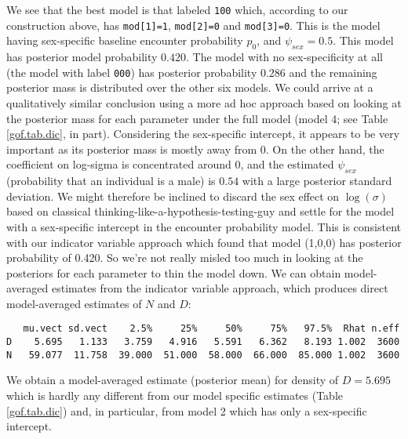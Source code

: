 {\begin{verbatim}
\end{verbatim}
We see that the best model is that labeled \mbox{\tt 100} which,
according to our construction above, has \mbox{\tt mod[1]=1},
\mbox{\tt mod[2]=0} and \mbox{\tt mod[3]=0}. This is the model 
having sex-specific baseline
encounter probability $p_{0}$, and $\psi_{sex} = 0.5$. This model has 
posterior model probability $0.420$. The model with no sex-specificity
at all (the model with label \mbox{\tt 000}) has
posterior probability $0.286$ and the remaining posterior mass is
distributed over the other six models. We could arrive at a
qualitatively similar conclusion using a more ad hoc approach based
on looking at the posterior mass for each parameter under the
full model (model 4; see Table \ref{gof.tab.dic}, in part). Considering
the sex-specific intercept, it appears to be very important as its
posterior mass is mostly away from 0.  On the other hand, the
coefficient on log-sigma is concentrated around 0, and the estimated
$\psi_{sex}$ (probability that an individual is a male) is $0.54$ with
a large posterior standard deviation.  We might therefore be inclined
to discard the sex effect on $\log(\sigma)$ based on classical
thinking-like-a-hypothesis-testing-guy and settle for the model with a
sex-specific intercept in the encounter probability model. This is consistent with our indicator variable
approach which found that model (1,0,0) has posterior probability of
0.420. So we're not really misled too much in looking at the
posteriors for each parameter to thin the model down.  We can obtain model-averaged estimates
from the indicator variable approach, which produces direct
model-averaged estimates of $N$ and $D$:
{\small
\begin{verbatim}
   mu.vect sd.vect    2.5%     25%     50%     75%   97.5%  Rhat n.eff
D    5.695   1.133   3.759   4.916   5.591   6.362   8.193 1.002  3600
N   59.077  11.758  39.000  51.000  58.000  66.000  85.000 1.002  3600
\end{verbatim}
}
We obtain a model-averaged estimate (posterior mean) for density of $D=5.695$
which is hardly any different from our
model specific estimates (Table \ref{gof.tab.dic}) and, in particular, from model 2
which has only a sex-specific intercept.



\begin{comment}
XXXX MIGHT BE GOOD TO HAVE THIS BUT OPTIONAL XXXXXXXXXXX
\subsection{Sensitivity to prior distributions}


\end{comment}}
